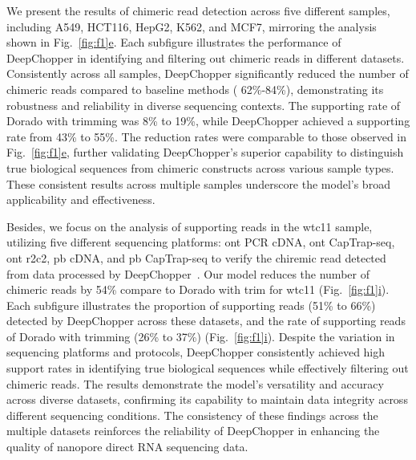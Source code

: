 \documentclass[pdflatex, sn-mathphys-num, lineno]{sn-jnl}%
\newcommand{\figref}[2]{Fig.~\hyperref[#1]{\ref*{#1}#2}}
\theoremstyle{thmstyleone}%
\theoremstyle{thmstyletwo}%
\theoremstyle{thmstylethree}%
\begin{document}
We present the results of chimeric read detection across five different samples, including A549, HCT116, HepG2, K562, and MCF7, mirroring the analysis shown in \figref{fig:f1}{e}.
Each subfigure  illustrates the performance of DeepChopper in identifying and filtering out chimeric reads in different datasets.
Consistently across all samples, DeepChopper significantly reduced the number of chimeric reads compared to baseline methods ( 62\%-84\%), demonstrating its robustness and reliability in diverse sequencing contexts.
The supporting rate of Dorado with trimming was 8\% to 19\%, while DeepChopper achieved a supporting rate from 43\% to 55\%.
The reduction rates were comparable to those observed in \figref{fig:f1}{e}, further validating DeepChopper’s superior capability to distinguish true biological sequences from chimeric constructs across various sample types.
These consistent results across multiple samples underscore the model's broad applicability and effectiveness.

Besides, we focus on the analysis of supporting reads in the wtc11 sample, utilizing five different sequencing platforms: \gls{ont} PCR cDNA, \gls{ont} CapTrap-seq, \gls{ont} \gls{r2c2}, \gls{pb} cDNA, and \gls{pb} CapTrap-seq to verify the chiremic read detected from data processed by DeepChopper~\cite{carbonell2024captrap}.
Our model reduces the number of chimeric reads by 54\% compare to Dorado with trim for wtc11  (\figref{fig:f1}{i}).
Each subfigure illustrates the proportion of supporting reads (51\% to 66\%) detected by DeepChopper across these datasets, and the rate of supporting reads of Dorado with trimming (26\% to 37\%)  (\figref{fig:f1}{i}).
Despite the variation in sequencing platforms and protocols, DeepChopper consistently achieved high support rates in identifying true biological sequences while effectively filtering out chimeric reads.
The results demonstrate the model's versatility and accuracy across diverse datasets, confirming its capability to maintain data integrity across different sequencing conditions.
The consistency of these findings across the multiple datasets reinforces the reliability of DeepChopper in enhancing the quality of nanopore direct RNA sequencing data.
\end{document}
